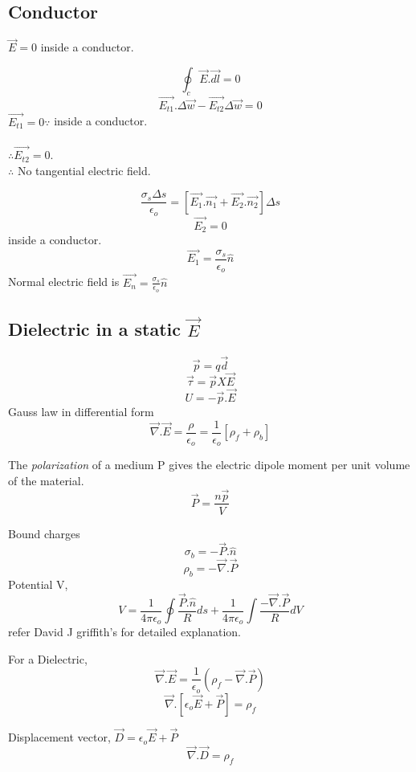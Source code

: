 \subsection*{Conductor}
\(\vec{E} = 0 \) inside a conductor.


\[
	\oint_c \vec{E}.\vec{dl} = 0
\]
\[
	\vec{E_{t1}} . \Delta \vec{w} - \vec{E_{t2}} \Delta \vec{w} = 0
\]
\(\vec{E_{t1}} = 0  \because\) inside a conductor.\\ \\
\(\therefore \vec{E_{t2}} = 0\).\\
\(\therefore\)  No tangential electric field.

\[
	\frac{\sigma_s \Delta s}{\epsilon_{o}} = [\vec{E_1}.\vec{n_1}+\vec{E_{2} }.\vec{n_2}] \Delta s
\]
\[
	\vec{E_2} = 0
\] inside a conductor.
\[
	\vec{E_1} = \frac{\sigma_s}{\epsilon_{o}} \hat{n}
\]
Normal electric field is \(\vec{E_n} = \frac{\sigma_s}{\epsilon_{o}} \hat{n}\) 

\subsection*{Dielectric in a static $\vec{E}$}
\[
	\vec{p} = q \vec{d}
\]
\[
	\vec{\tau} = \vec{p} X \vec{E}
\]
\[
	U = - \vec{p} . \vec{E}
\]
Gauss law in differential form
\[
	\vec{\nabla}.\vec{E} = \frac{\rho}{\epsilon_{o}} = \frac{1}{\epsilon_o} [\rho_{f} +\rho_{b}]
\]
\begin{definition}
	The \emph{polarization} of a medium P gives the electric dipole moment per unit volume of the material.
	\[
		\vec{P} = \frac{n \vec{p}}{V}
	\]
\end{definition}
Bound charges
\[
	\sigma_b = -\vec{P}.\hat{n}
\]
\[
	\rho_{b} = -\vec{\nabla}.\vec{P}
\]
Potential V,
\[
	V = \frac{1}{4 \pi \epsilon_{o}} \oint \frac{\vec{P}.\hat{n}}{R} ds + \frac{1}{4 \pi \epsilon_{o}} \int \frac{-\vec{\nabla}.\vec{P}}{R}dV
\]
refer David J griffith's for detailed explanation.

For a Dielectric,
\[
	\vec{\nabla}.\vec{E} = \frac{1}{\epsilon_{o}}(\rho_f - \vec{\nabla}.\vec{P})
\]
\[
	\vec{\nabla}.[\epsilon_{o} \vec{E}+\vec{P}] = \rho_f
\]
\begin{definition}
	Displacement vector, \(\vec{D} = \epsilon_{o} \vec{E}+\vec{P}\) 
	\[
		\vec{\nabla}.\vec{D} = \rho_f
	\]
\end{definition}